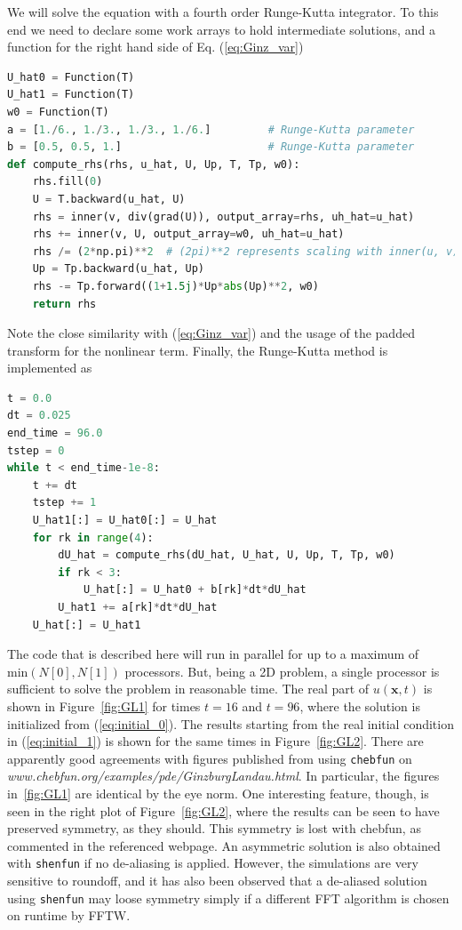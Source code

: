 \documentclass[%
oneside,                 %
final,                   %
10pt]{article}
\begin{document}
We will solve the equation with a fourth order Runge-Kutta integrator. To this end we need to declare some work arrays to hold intermediate solutions, and a function for the right hand side of Eq. (\ref{eq:Ginz_var})
\begin{lstlisting}[language=Python,style=yellow2_fb]
U_hat0 = Function(T)
U_hat1 = Function(T)
w0 = Function(T)
a = [1./6., 1./3., 1./3., 1./6.]         # Runge-Kutta parameter
b = [0.5, 0.5, 1.]                       # Runge-Kutta parameter
def compute_rhs(rhs, u_hat, U, Up, T, Tp, w0):
    rhs.fill(0)
    U = T.backward(u_hat, U)
    rhs = inner(v, div(grad(U)), output_array=rhs, uh_hat=u_hat)
    rhs += inner(v, U, output_array=w0, uh_hat=u_hat)
    rhs /= (2*np.pi)**2  # (2pi)**2 represents scaling with inner(u, v)
    Up = Tp.backward(u_hat, Up)
    rhs -= Tp.forward((1+1.5j)*Up*abs(Up)**2, w0)
    return rhs
\end{lstlisting}
Note the close similarity with (\ref{eq:Ginz_var}) and the usage of the padded transform for the nonlinear term.
Finally, the Runge-Kutta method is implemented as
\begin{lstlisting}[language=Python,style=yellow2_fb]
t = 0.0
dt = 0.025
end_time = 96.0
tstep = 0
while t < end_time-1e-8:
    t += dt
    tstep += 1
    U_hat1[:] = U_hat0[:] = U_hat
    for rk in range(4):
        dU_hat = compute_rhs(dU_hat, U_hat, U, Up, T, Tp, w0)
        if rk < 3:
            U_hat[:] = U_hat0 + b[rk]*dt*dU_hat
        U_hat1 += a[rk]*dt*dU_hat
    U_hat[:] = U_hat1
\end{lstlisting}
The code that is described here will run in parallel for up to a maximum of $\text{min}(N[0], N[1])$ processors. But, being a 2D problem, a single processor is sufficient to solve the problem in reasonable time. The real part of $u(\boldsymbol{x}, t)$ is shown in Figure~\ref{fig:GL1} for times $t=16$ and $t=96$, where the solution is initialized from (\ref{eq:initial_0}). The results starting from the real initial condition in (\ref{eq:initial_1}) is shown for the same times in Figure~\ref{fig:GL2}. There are apparently good agreements with figures published from using \texttt{chebfun} on \emph{www.chebfun.org/examples/pde/GinzburgLandau.html}. In particular, the figures in~\ref{fig:GL1}  are identical by the eye norm. One interesting feature, though, is seen in the right plot of Figure~\ref{fig:GL2}, where the results can be seen to have preserved symmetry, as they should. This symmetry is lost with chebfun, as commented in the referenced webpage. An asymmetric solution is also obtained with \texttt{shenfun} if no de-aliasing is applied. However, the simulations are very sensitive to roundoff, and it has also been observed that a de-aliased solution using \texttt{shenfun} may loose symmetry simply if a different FFT algorithm is chosen on runtime by FFTW.
\end{document}
